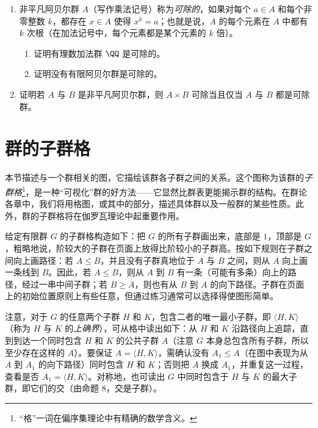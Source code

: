\begin{enumerate}[label=\arabic*.]
\begin{enumerate}[label=(\alph*)]
    \item $H_k\leq H_m$ 当且仅当 $k\leq m$；
    \item 每个 $H_k$ 都是循环群（可假设对任意 $n\in\ZZ^+$，$\{e^{2\pi it/n}\mid t=0,1,\ldots,n-1\}$ 是 $\CC$ 中所有 $n$ 次单位根的集合）；
    \item $Z$ 的每个真子群都等于某个 $H_k$（特别地，$Z$ 的每个真子群都是有限循环群）；
    \item $Z$ 不是有限生成的。
  \end{enumerate}
  \item 非平凡阿贝尔群 $A$（写作乘法记号）称为\emph{可除的}，如果对每个 $a\in A$ 和每个非零整数 $k$，都存在 $x\in A$ 使得 $x^k=a$；也就是说，$A$ 的每个元素在 $A$ 中都有 $k$ 次根（在加法记号中，每个元素都是某个元素的 $k$ 倍）。
  \begin{enumerate}[label=(\alph*)]
    \item 证明有理数加法群 $\QQ$ 是可除的。
    \item 证明没有有限阿贝尔群是可除的。
  \end{enumerate}
  \item 证明若 $A$ 与 $B$ 是非平凡阿贝尔群，则 $A\times B$ 可除当且仅当 $A$ 与 $B$ 都是可除群。
\end{enumerate}


\section{群的子群格}

本节描述与一个群相关的图，它描绘该群各子群之间的关系。这个图称为该群的\emph{子群格}\footnote{“格”一词在偏序集理论中有精确的数学含义。}，是一种“可视化”群的好方法——它显然比群表更能揭示群的结构。在群论各章中，我们将用格图，或其中的部分，描述具体群以及一般群的某些性质。此外，群的子群格将在伽罗瓦理论中起重要作用。

给定有限群 $G$ 的子群格构造如下：把 $G$ 的所有子群画出来，底部是 $1$，顶部是 $G$，粗略地说，阶较大的子群在页面上放得比阶较小的子群高。按如下规则在子群之间向上画路径：若 $A\leq B$，并且没有子群真地位于 $A$ 与 $B$ 之间，则从 $A$ 向上画一条线到 $B$。因此，若 $A\leq B$，则从 $A$ 到 $B$ 有一条（可能有多条）向上的路径，经过一串中间子群；若 $B\geq A$，则也有从 $B$ 到 $A$ 的向下路径。子群在页面上的初始位置原则上有些任意，但通过练习通常可以选择得使图形简单。

注意，对于 $G$ 的任意两个子群 $H$ 和 $K$，包含二者的唯一最小子群，即 $\langle H,K\rangle$（称为 $H$ 与 $K$ 的\emph{上确界}），可从格中读出如下：从 $H$ 和 $K$ 沿路径向上追踪，直到到达一个同时包含 $H$ 和 $K$ 的公共子群 $A$（注意 $G$ 本身总包含所有子群，所以至少存在这样的 $A$）。要保证 $A=\langle H,K\rangle$，需确认没有 $A_1\leq A$（在图中表现为从 $A$ 到 $A_1$ 的向下路径）同时包含 $H$ 和 $K$；否则把 $A$ 换成 $A_1$，并重复这一过程，查看是否 $A_1=\langle H,K\rangle$。对称地，也可读出 $G$ 中同时包含于 $H$ 与 $K$ 的最大子群，即它们的交（由命题 8，交是子群）。

